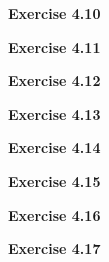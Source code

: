 \documentclass{article}
\begin{document}
\bigskip

\begin{framed}
    \noindent \textbf{Exercise 4.10}
    
    \medskip
    
    
\end{framed}


\bigskip

\begin{framed}
    \noindent \textbf{Exercise 4.11}
    
    \medskip
    
    
\end{framed}


\bigskip

\begin{framed}
    \noindent \textbf{Exercise 4.12}
    
    \medskip
    
    
\end{framed}


\bigskip

\begin{framed}
    \noindent \textbf{Exercise 4.13}
    
    \medskip
    
    
\end{framed}


\bigskip

\begin{framed}
    \noindent \textbf{Exercise 4.14}
    
    \medskip
    
    
\end{framed}


\bigskip

\begin{framed}
    \noindent \textbf{Exercise 4.15}
    
    \medskip
    
    
\end{framed}


\bigskip

\begin{framed}
    \noindent \textbf{Exercise 4.16}
    
    \medskip
    
    
\end{framed}


\bigskip

\begin{framed}
    \noindent \textbf{Exercise 4.17}
    
    \medskip
    
    
\end{framed}
\end{document}
